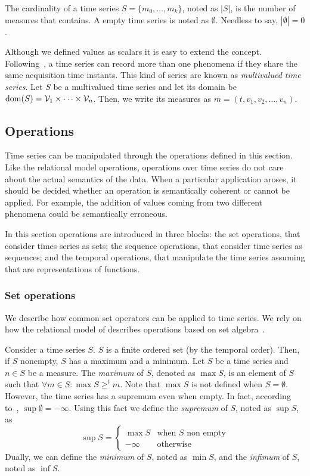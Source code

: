 The cardinality of a time series $S=\{m_0,\dots,m_k\}$, noted as
$|S|$, is the number of measures that contains.  A empty time series is
noted as $\emptyset$. Needless to say, $|\emptyset|=0$.

Although we defined values as scalars it is easy to extend the
concept. Following~\cite{assfalg08:thesis}, a time series can record
more than one phenomena if they share the same acquisition time
instants.  This kind of series are known as \emph{multivalued time
  series}. Let $S$ be a multivalued time series and let its domain be
$\operatorname{dom}(S)={\cal{V}}_1\times\cdots\times{\cal{V}}_n$. Then, we write its measures as $m=(t,v_1,v_2,\ldots,v_n)$.





\subsection{Operations}
\label{sec:model:operations}

Time series can be manipulated through the operations defined in this
section.
%
Like the relational model operations, operations over time series do
not care about the actual semantics of the data. When a particular
application aroses, it should be decided whether an operation is
semantically coherent or cannot be applied. For example, the addition
of values coming from two different phenomena could be semantically
erroneous.

In this section operations are introduced in three blocks: the set
operations, that consider times series as sets; the sequence
operations, that consider time series as sequences; and the temporal
operations, that manipulate the time series assuming that are
representations of functions. 



\subsubsection{Set operations}

We describe how common set operators can be applied to time series. We
rely on how the relational model of  describes operations
based on set algebra~\cite{date:introduction}.

Consider a time series $S$. $S$ is a finite ordered set (by the
temporal order). Then, if $S$ nonempty, $S$ has a maximum and a
minimum.  
%
Let $S$ be a time series and $n\in S$ be a measure. The \emph{maximum}
of $S$, denoted as $\max S$, is an element of $S$ such that $\forall m
\in S:\max S\geq^t m $.  
%
Note that $\max S$ is not defined when $S=\emptyset$. However, the
time series has a supremum even when empty. In fact, according
to~\cite{cantrell:extendedreal}, $\sup \emptyset=-\infty$.
%
Using this fact we define the \emph{supremum} of $S$, noted as
$\sup S$, as
\[
\sup S =\begin{cases}
  \max S    & \text{when $S$ non empty}\\
  -\infty   & \text{otherwise}
\end{cases}
\]
Dually, we can define the \emph{minimum} of $S$, noted as $\min S$,
and the \emph{infimum} of $S$, noted as $\inf S$.

